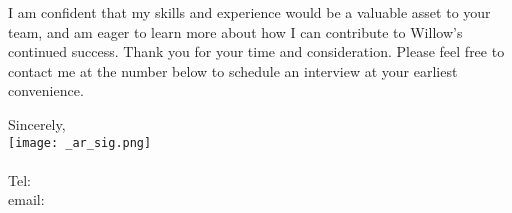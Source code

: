 \documentclass[letterpaper]{article}
\begin{document}
I am confident that my skills and experience would be a valuable asset to your team, and
am eager to learn more about how I can contribute to Willow's continued success.
Thank you for your time and consideration.
Please feel free to contact me at the number below to schedule an interview at your earliest convenience.

Sincerely,\\
    \hspace{1em}
    \texttt{[image: \_ar\_sig.png]} \\
    \CVsigname \\
    \small
    Tel: \CVphone \\
    email: \CVemail
\end{document}

